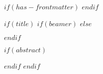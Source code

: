 $if(has-frontmatter)$
  \frontmatter
$endif$


  $if(title)$
  $if(beamer)$
  \frame{\titlepage}
$else$
    \maketitle
$endif$

  \restoregeometry

  $if(abstract)$
  \begin{abstract}
$abstract$
  \end{abstract}
$endif$
  $endif$

